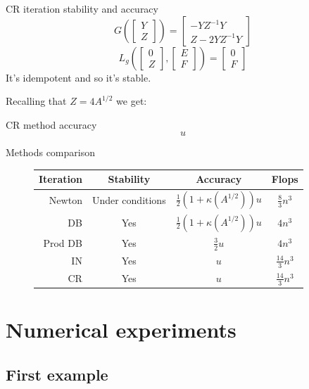 \documentclass{beamer}
\theoremstyle{plain}
\theoremstyle{definition}
\theoremstyle{remark}
\newcommand{\pa}[1]{\left(#1\right)}
\newcommand{\bra}[1]{\left[#1\right]}
\begin{document}
\begin{frame}{CR iteration stability and accuracy}
  \[ G\pa{\bra{\begin{matrix}Y\\Z\end{matrix}}} = \bra{
      \begin{matrix}
        -YZ^{-1}Y  \\
        Z-2YZ^{-1}Y
      \end{matrix}} \]
  \[ L_g\pa{ \bra{ \begin{matrix}0\\Z\end{matrix}},
      \bra{\begin{matrix}E\\F\end{matrix}}} = \bra{\begin{matrix}0\\
        F \end{matrix}} \]
  It's idempotent and so it's stable. \vfill
  
  Recalling that $Z = 4A^{1/2}$ we get:
  \begin{block}{CR method accuracy}
    \[ u \]
  \end{block}
\end{frame}

\begin{frame}{Methods comparison}
  \begin{figure}
    \begin{tabular}{ r | c c >{\small}c }
      Iteration & Stability & Accuracy & Flops \\
      \hline
      Newton & Under conditions & $\frac{1}{2}\pa{1+ \kappa\pa{A^{1/2}}}u$ & $\frac{8}{3}n^3$ \\
      DB & Yes & $\frac{1}{2}\pa{1+ \kappa\pa{A^{1/2}}}u$ & $4n^3$ \\
      Prod DB & Yes & $\frac{3}{2}u$ & $4n^3$ \\
      IN & Yes & $u$ & $\frac{14}{3}n^3$ \\
      CR & Yes & $u$ & $\frac{14}{3}n^3$
    \end{tabular}
  \end{figure}
\end{frame}

\section{Numerical experiments}

\subsection{First example}
\end{document}

